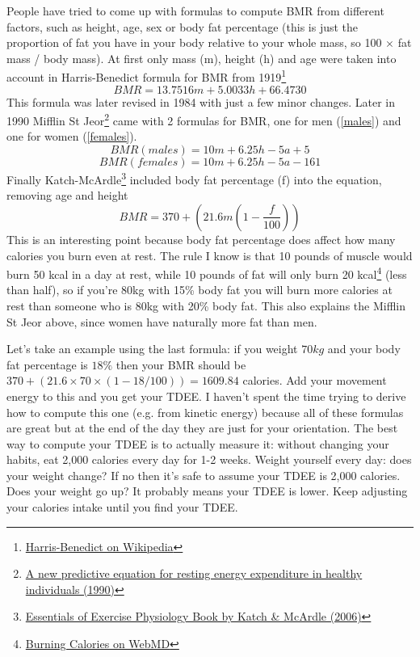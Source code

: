 \documentclass[openany, 12pt]{book}
\begin{document}
	People have tried to come up with formulas to compute BMR from different factors, such as height, age, sex or body fat percentage (this is just
	the proportion of fat you have in your body relative to your whole mass, so 100 $\times$ fat mass / body mass). At first only mass (m), height (h) 
	and age were taken into account in Harris-Benedict formula for BMR from 1919\footnote{\href{
	https://en.wikipedia.org/wiki/Harris\%E2\%80\%93Benedict_equation}{Harris-Benedict on Wikipedia}}
	\begin{equation}
		BMR = 13.7516m + 5.0033h + 66.4730
	\end{equation}
  	This formula was later revised in 1984 with just a few minor changes. Later in 1990 Mifflin St Jeor\footnote{\href{https://pubmed.ncbi.nlm.nih.gov/2305711/}{A new predictive equation for resting energy expenditure in healthy individuals (1990)}} came with 2 formulas for BMR, one for men (\ref{males}) and one for women (\ref{females}).
	\begin{equation}
		\label{males}
		BMR (males) = 10m + 6.25h - 5a + 5
	\end{equation}
	\begin{equation}
		\label{females}
		BMR (females) = 10m + 6.25h - 5a - 161
	\end{equation}
	Finally Katch-McArdle\footnote{\href{https://books.google.co.uk/books/about/Essentials_of_Exercise_Physiology.html?id=L4aZIDbmV3oC}{Essentials of Exercise Physiology Book by Katch \& McArdle (2006)}} included body fat percentage (f) into the equation, removing age and height
	\begin{equation}
		BMR = 370 + (21.6m (1 - \frac{f}{100}))
	\end{equation}
	This is an interesting point because body fat percentage does affect how many calories you burn even at rest. The rule I know is that 10 pounds of muscle would burn 50 kcal in a day at rest, while 10 pounds of fat will only burn 20 kcal\footnote{\href{https://www.webmd.com/diet/obesity/features/8-ways-to-burn-calories-and-fight-fat}{Burning Calories on WebMD}} (less than half), so if you're 80kg with 15\% body fat you will burn more calories at rest than someone who is 80kg with 20\% body fat. This also explains the Mifflin St Jeor above, since women have naturally more fat than men. 
	
	Let's take an example using the last formula: if you weight $70kg$ and your body fat percentage is $18\%$ then your BMR should be $370 + (21.6 \times 70 \times (1 - 18/100)) = 1609.84$ calories. Add your movement energy to this and you get your TDEE. I haven't spent the time trying to derive how to
	compute this one (e.g. from kinetic energy) because all of these formulas are great but at the end of the day they are just for your orientation.
	The best way to compute your TDEE is to actually measure it: without changing your habits, eat 2,000 calories every day for 1-2 weeks. Weight
	yourself every day: does your weight change? If no then it's safe to assume your TDEE is 2,000 calories. Does your weight go up? It probably means
	your TDEE is lower. Keep adjusting your calories intake until you find your TDEE. 
	
\end{document}
